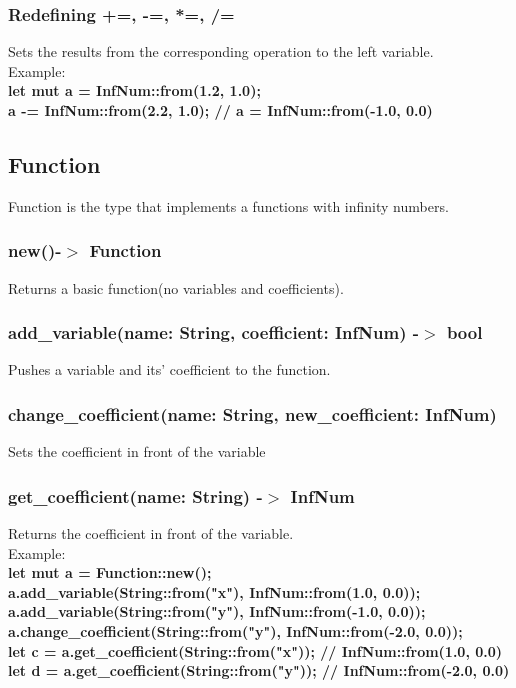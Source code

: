 \documentclass[]{article}
\begin{document}
				\subsubsection{Redefining +=, -=, *=, /=}
					Sets the results from the corresponding operation to the left variable.\\Example:\\
					\large{\textbf{let mut a = InfNum::from(1.2, 1.0);\\
						a -= InfNum::from(2.2, 1.0); // a = InfNum::from(-1.0, 0.0)}}

			\subsection{Function}
				\Large{Function is the type that implements a functions with infinity numbers.}
				\subsubsection{new()-$>$ Function}
					Returns a basic function(no variables and coefficients).
				\subsubsection{add\_variable(name: String, coefficient: InfNum) -$>$ bool}
					Pushes a variable and its' coefficient to the function.
				\subsubsection{change\_coefficient(name: String, new\_coefficient: InfNum)}
					Sets the coefficient in front of the variable
				\subsubsection{get\_coefficient(name: String) -$>$ InfNum}
					Returns the coefficient in front of the variable.\\Example:\\
					\large{\textbf{let mut a = Function::new();\\
						a.add\_variable(String::from("x"), InfNum::from(1.0, 0.0));\\
						a.add\_variable(String::from("y"), InfNum::from(-1.0, 0.0));\\
						a.change\_coefficient(String::from("y"), InfNum::from(-2.0, 0.0));\\
						let c = a.get\_coefficient(String::from("x")); // InfNum::from(1.0, 0.0)\\
						let d = a.get\_coefficient(String::from("y")); // InfNum::from(-2.0, 0.0)\\}}
\end{document}
